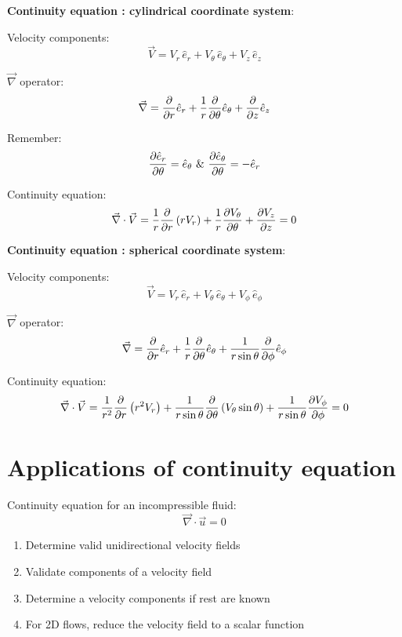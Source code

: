 {\bf Continuity equation : cylindrical coordinate system}:

Velocity components:
$$ \vec{V} = V_r \, \hat{e}_r + V_\theta \, \hat{e}_\theta + V_z \, \hat{e}_z $$

$\vec{\nabla}$ operator:
$$ \vec{\nabla} = {\partial \over \partial r} \hat{e}_r + {1 \over r} {\partial \over \partial \theta} \hat{e}_\theta + {\partial \over \partial z} \hat{e}_z $$

Remember:
$$ {\partial \hat{e}_r \over \partial \theta} = \hat{e}_\theta \, \, \& \, \, {\partial \hat{e}_\theta \over \partial \theta} = -\hat{e}_r$$

Continuity equation:
$$ \vec{\nabla} \cdot \vec{V} = {1 \over r} {\partial \over \partial r} \left( r V_r \right) + {1 \over r} {\partial V_\theta \over \partial \theta} + {\partial V_z \over \partial z} = 0 $$



{\bf Continuity equation : spherical coordinate system}:

Velocity components:
$$ \vec{V} = V_r \, \hat{e}_r + V_\theta \, \hat{e}_\theta + V_\phi \, \hat{e}_\phi $$

$\vec{\nabla}$ operator:
$$ \vec{\nabla} = {\partial \over \partial r} \hat{e}_r + {1 \over r} {\partial \over \partial \theta} \hat{e}_\theta + {1 \over r\sin\theta}{\partial \over \partial \phi} \hat{e}_\phi $$

Continuity equation:
$$ \vec{\nabla} \cdot \vec{V} = {1 \over r^2} {\partial \over \partial r} \left( r^2 V_r \right) + {1 \over r \sin\theta} {\partial \over \partial \theta} \left( V_\theta \sin\theta \right) + {1 \over r \sin\theta} {\partial V_\phi \over \partial \phi} = 0 $$



\section{Applications of continuity equation}
Continuity equation for an incompressible fluid:
$$ \vec{\nabla} \cdot \vec{u} = 0 $$
\begin{enumerate}
\item Determine valid unidirectional velocity fields
\item Validate components of a velocity field
\item Determine a velocity components if rest are known
\item For 2D flows, reduce the velocity field to a scalar function
\end{enumerate}


